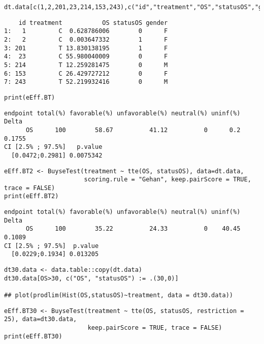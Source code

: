 \documentclass[12pt]{article}
\begin{document}
\lstset{language=r,label= ,caption= ,captionpos=b,numbers=none}
\begin{lstlisting}
dt.data[c(1,2,201,23,214,153,243),c("id","treatment","OS","statusOS","gender")]
\end{lstlisting}

\begin{verbatim}
    id treatment           OS statusOS gender
1:   1         C  0.628786006        0      F
2:   2         C  0.003647332        1      F
3: 201         T 13.830138195        1      F
4:  23         C 55.980040009        0      F
5: 214         T 12.259281475        0      M
6: 153         C 26.429727212        0      F
7: 243         T 52.219932416        0      M
\end{verbatim}


\lstset{language=r,label= ,caption= ,captionpos=b,numbers=none}
\begin{lstlisting}
print(eEff.BT)
\end{lstlisting}

\begin{verbatim}
endpoint total(%) favorable(%) unfavorable(%) neutral(%) uninf(%)  Delta
      OS      100        58.67          41.12          0      0.2 0.1755
CI [2.5% ; 97.5%]   p.value
  [0.0472;0.2981] 0.0075342
\end{verbatim}


\lstset{language=r,label= ,caption= ,captionpos=b,numbers=none}
\begin{lstlisting}
eEff.BT2 <- BuyseTest(treatment ~ tte(OS, statusOS), data=dt.data,
                      scoring.rule = "Gehan", keep.pairScore = TRUE, trace = FALSE)
print(eEff.BT2)
\end{lstlisting}

\begin{verbatim}
endpoint total(%) favorable(%) unfavorable(%) neutral(%) uninf(%)  Delta
      OS      100        35.22          24.33          0    40.45 0.1089
CI [2.5% ; 97.5%]  p.value
  [0.0229;0.1934] 0.013205
\end{verbatim}


\lstset{language=r,label= ,caption= ,captionpos=b,numbers=none}
\begin{lstlisting}
dt30.data <- data.table::copy(dt.data)
dt30.data[OS>30, c("OS", "statusOS") := .(30,0)]

## plot(prodlim(Hist(OS,statusOS)~treatment, data = dt30.data))
\end{lstlisting}

\lstset{language=r,label= ,caption= ,captionpos=b,numbers=none}
\begin{lstlisting}
eEff.BT30 <- BuyseTest(treatment ~ tte(OS, statusOS, restriction = 25), data=dt30.data,
                       keep.pairScore = TRUE, trace = FALSE)
print(eEff.BT30)
\end{lstlisting}
\end{document}
